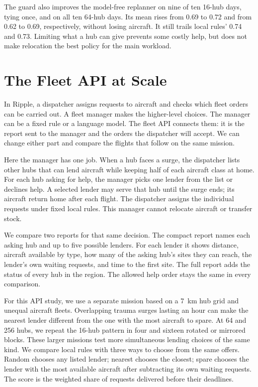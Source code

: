 \documentclass[letterpaper,10pt,conference]{ieeeconf}
\begin{document}
The guard also improves the model-free replanner on nine of ten 16-hub
days, tying once, and on all ten 64-hub days. Its mean rises from 0.69
to 0.72 and from 0.62 to 0.69, respectively, without losing aircraft.
It still trails local rules' 0.74 and 0.73. Limiting what a hub can give
prevents some costly help, but does not make relocation the best policy
for the main workload.

\section{The Fleet API at Scale}
\label{sec:scale}

In Ripple, a dispatcher assigns requests to aircraft and checks which
fleet orders can be carried out. A fleet manager makes the higher-level
choices. The manager can be a fixed rule or a language model. The fleet
API connects them: it is the report sent to the manager and the orders
the dispatcher will accept. We can change either part and compare the
flights that follow on the same mission.

Here the manager has one job. When a hub faces a surge, the dispatcher
lists other hubs that can lend aircraft while keeping half of each
aircraft class at home. For each hub asking for help, the manager picks
one lender from the list or declines help. A selected lender may serve
that hub until the surge ends; its aircraft return home after each
flight. The dispatcher assigns the individual requests under fixed
local rules. This manager cannot relocate aircraft or transfer stock.

We compare two reports for that same decision. The compact report
names each asking hub and up to five possible lenders. For each lender
it shows distance, aircraft available by type, how many of the asking
hub's sites they can reach, the lender's own waiting requests, and time
to the first site. The full report adds the status of every hub in the
region. The allowed help order
stays the same in every comparison.

For this API study, we use a separate mission based on a 7~km hub grid and
unequal aircraft fleets. Overlapping trauma surges lasting an hour can make
the nearest lender different from the one with the most aircraft to
spare. At 64 and 256 hubs, we repeat the 16-hub pattern in four and
sixteen rotated or mirrored blocks. These larger missions test more
simultaneous lending choices of the same kind. We compare local rules
with three ways to choose from the same offers. Random chooses any
listed lender; nearest chooses the closest; spare chooses the lender
with the most available aircraft after subtracting its own waiting
requests. The score is the weighted share of requests delivered before
their deadlines.
\end{document}
